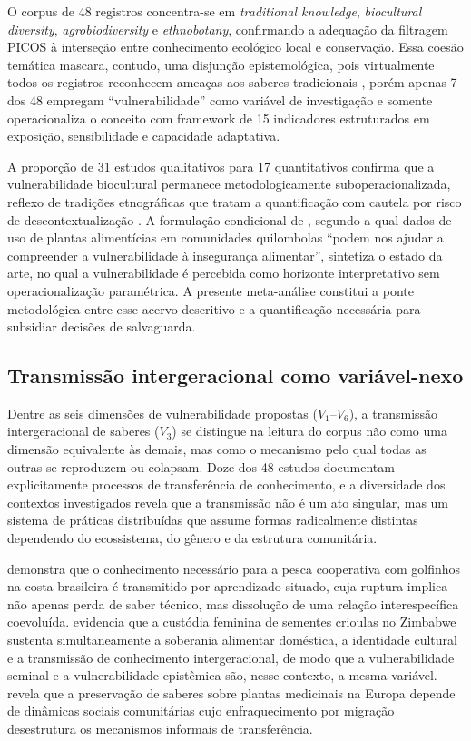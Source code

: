O corpus de 48 registros concentra-se em \textit{traditional knowledge}, \textit{biocultural diversity}, \textit{agrobiodiversity} e \textit{ethnobotany}, confirmando a adequação da filtragem PICOS à interseção entre conhecimento ecológico local e conservação. Essa coesão temática mascara, contudo, uma disjunção epistemológica, pois virtualmente todos os registros reconhecem ameaças aos saberes tradicionais \cite{Mobarak2025,LaRosa2021,Suwardi2025,Essien2025}, porém apenas 7 dos 48 empregam ``vulnerabilidade'' como variável de investigação e somente  operacionaliza o conceito com framework de 15 indicadores estruturados em exposição, sensibilidade e capacidade adaptativa.

A proporção de 31 estudos qualitativos para 17 quantitativos confirma que a vulnerabilidade biocultural permanece metodologicamente suboperacionalizada, reflexo de tradições etnográficas que tratam a quantificação com cautela por risco de descontextualização \cite{Agrawal2002}. A formulação condicional de , segundo a qual dados de uso de plantas alimentícias em comunidades quilombolas ``podem nos ajudar a compreender a vulnerabilidade à insegurança alimentar'', sintetiza o estado da arte, no qual a vulnerabilidade é percebida como horizonte interpretativo sem operacionalização paramétrica. A presente meta-análise constitui a ponte metodológica entre esse acervo descritivo e a quantificação necessária para subsidiar decisões de salvaguarda.

\subsection{Transmissão intergeracional como variável-nexo}
\label{sec:dimensional-coverage_cap2}

Dentre as seis dimensões de vulnerabilidade propostas ($V_1$--$V_6$), a transmissão intergeracional de saberes ($V_3$) se distingue na leitura do corpus não como uma dimensão equivalente às demais, mas como o mecanismo pelo qual todas as outras se reproduzem ou colapsam. Doze dos 48 estudos documentam explicitamente processos de transferência de conhecimento, e a diversidade dos contextos investigados revela que a transmissão não é um ato singular, mas um sistema de práticas distribuídas que assume formas radicalmente distintas dependendo do ecossistema, do gênero e da estrutura comunitária.

 demonstra que o conhecimento necessário para a pesca cooperativa com golfinhos na costa brasileira é transmitido por aprendizado situado, cuja ruptura implica não apenas perda de saber técnico, mas dissolução de uma relação interespecífica coevoluída.  evidencia que a custódia feminina de sementes crioulas no Zimbabwe sustenta simultaneamente a soberania alimentar doméstica, a identidade cultural e a transmissão de conhecimento intergeracional, de modo que a vulnerabilidade seminal e a vulnerabilidade epistêmica são, nesse contexto, a mesma variável.  revela que a preservação de saberes sobre plantas medicinais na Europa depende de dinâmicas sociais comunitárias cujo enfraquecimento por migração desestrutura os mecanismos informais de transferência.

